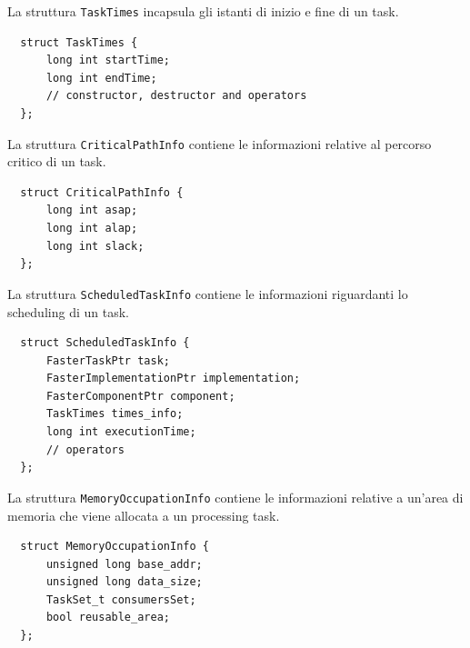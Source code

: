 La struttura \verb+TaskTimes+ incapsula gli istanti di inizio e fine di un task.
\newline
\begin{verbatim}
  struct TaskTimes {
      long int startTime;
      long int endTime;
      // constructor, destructor and operators
  };
\end{verbatim}

La struttura \verb+CriticalPathInfo+ contiene le informazioni relative al 
percorso critico di un task.
\newline
\begin{verbatim}
  struct CriticalPathInfo {
      long int asap;
      long int alap;
      long int slack;
  };
\end{verbatim}

La struttura \verb+ScheduledTaskInfo+ contiene le informazioni riguardanti lo 
scheduling di un task.
\newline
\begin{verbatim}
  struct ScheduledTaskInfo {
      FasterTaskPtr task;
      FasterImplementationPtr implementation;
      FasterComponentPtr component;
      TaskTimes times_info;
      long int executionTime;
      // operators
  };
\end{verbatim}

La struttura \verb+MemoryOccupationInfo+ contiene le informazioni relative a 
un'area di memoria che viene allocata a un processing task.
\newline
\begin{verbatim}
  struct MemoryOccupationInfo {
      unsigned long base_addr;
      unsigned long data_size;
      TaskSet_t consumersSet;
      bool reusable_area;
  };
\end{verbatim}



